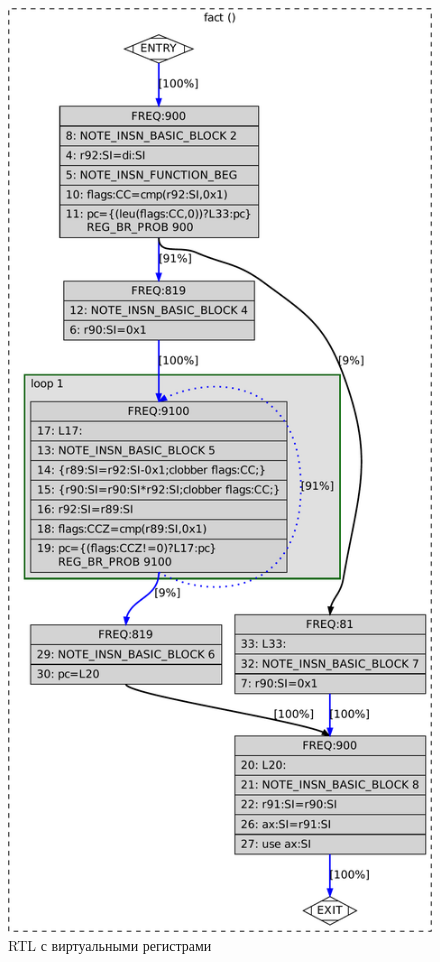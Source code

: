 \documentclass[a4paper,12pt,oneside]{article}
\begin{document}
\begin{figure}[htb]
\centering
\includegraphics[height=0.7\textheight]{illustrations/fact-expanded-crop.pdf}
\caption{RTL с виртуальными регистрами}
\label{fig:fact_rtl_expand}
\end{figure}
\end{document}
